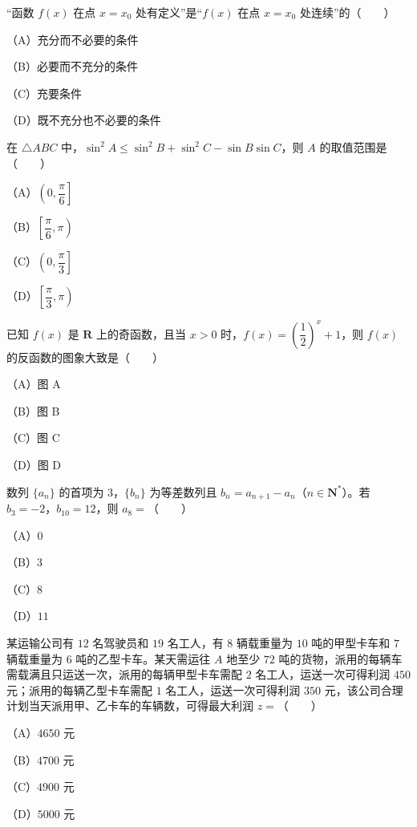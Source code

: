 \begin{question}
“函数 $f(x)$ 在点 $x=x_0$ 处有定义”是“$f(x)$ 在点 $x=x_0$ 处连续”的\mbox{（　　）}

（A）充分而不必要的条件

（B）必要而不充分的条件

（C）充要条件

（D）既不充分也不必要的条件

\end{question}
\begin{question}
在 $\triangle ABC$ 中，$\sin^2A\leqslant\sin^2B+\sin^2C-\sin B\sin C$，则 $A$ 的取值范围是\mbox{（　　）}

（A）$\left(0,\dfrac{\pi}{6}\right]$

（B）$\left[\dfrac{\pi}{6},\pi\right)$

（C）$\left(0,\dfrac{\pi}{3}\right]$

（D）$\left[\dfrac{\pi}{3},\pi\right)$

\Needspace{0.4\textheight}
\end{question}
\begin{question}
已知 $f(x)$ 是 $\mathbf R$ 上的奇函数，且当 $x>0$ 时，$f(x)=\left(\dfrac12\right)^x+1$，则 $f(x)$ 的反函数的图象大致是\mbox{（　　）}

（A）图 A

（B）图 B

（C）图 C

（D）图 D
\nopagebreak[4]
\begin{center}\end{center}
\nopagebreak[4]
\end{question}
\begin{question}
数列 $\{a_n\}$ 的首项为 $3$，$\{b_n\}$ 为等差数列且 $b_n=a_{n+1}-a_n$（$n\in\mathbf N^*$）。若 $b_3=-2$，$b_{10}=12$，则 $a_8=$\mbox{（　　）}

（A）$0$

（B）$3$

（C）$8$

（D）$11$

\end{question}
\begin{question}
某运输公司有 $12$ 名驾驶员和 $19$ 名工人，有 $8$ 辆载重量为 $10$ 吨的甲型卡车和 $7$ 辆载重量为 $6$ 吨的乙型卡车。某天需运往 $A$ 地至少 $72$ 吨的货物，派用的每辆车需载满且只运送一次，派用的每辆甲型卡车需配 $2$ 名工人，运送一次可得利润 $450$ 元；派用的每辆乙型卡车需配 $1$ 名工人，运送一次可得利润 $350$ 元，该公司合理计划当天派用甲、乙卡车的车辆数，可得最大利润 $z=$\mbox{（　　）}

（A）$4650$ 元

（B）$4700$ 元

（C）$4900$ 元

（D）$5000$ 元

\end{question}
